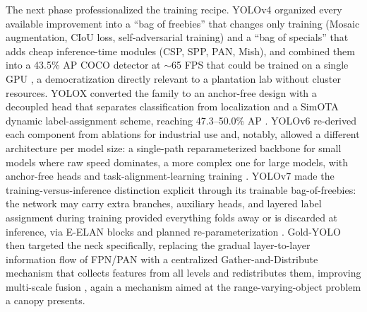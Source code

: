 The next phase professionalized the training recipe. YOLOv4 organized every available improvement into a ``bag of freebies'' that changes only training (Mosaic augmentation, CIoU loss, self-adversarial training) and a ``bag of specials'' that adds cheap inference-time modules (CSP, SPP, PAN, Mish), and combined them into a 43.5\% AP COCO detector at $\sim$65 FPS that could be trained on a single GPU \cite{bochkovskiy2020yolov4}, a democratization directly relevant to a plantation lab without cluster resources. YOLOX converted the family to an anchor-free design with a decoupled head that separates classification from localization and a SimOTA dynamic label-assignment scheme, reaching 47.3--50.0\% AP \cite{ge2021yolox}. YOLOv6 re-derived each component from ablations for industrial use and, notably, allowed a different architecture per model size: a single-path reparameterized backbone for small models where raw speed dominates, a more complex one for large models, with anchor-free heads and task-alignment-learning training \cite{li2022yolov6}. YOLOv7 made the training-versus-inference distinction explicit through its trainable bag-of-freebies: the network may carry extra branches, auxiliary heads, and layered label assignment during training provided everything folds away or is discarded at inference, via E-ELAN blocks and planned re-parameterization \cite{wang2023yolov7}. Gold-YOLO then targeted the neck specifically, replacing the gradual layer-to-layer information flow of FPN/PAN with a centralized Gather-and-Distribute mechanism that collects features from all levels and redistributes them, improving multi-scale fusion \cite{wang2023goldyolo}, again a mechanism aimed at the range-varying-object problem a canopy presents.

